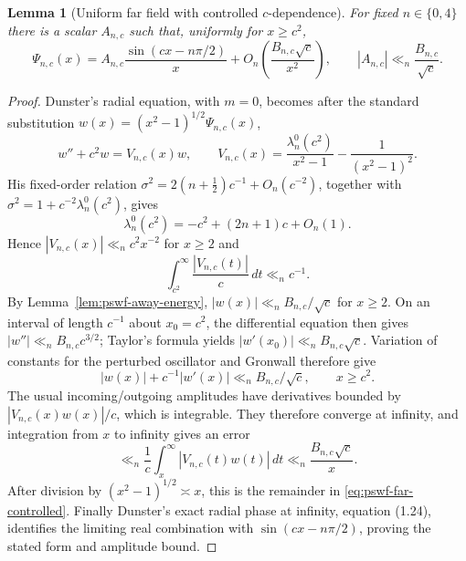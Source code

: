 \documentclass[11pt]{article}
\newtheorem{lemma}[theorem]{Lemma}
\theoremstyle{remark}
\begin{document}
\begin{lemma}[Uniform far field with controlled $c$-dependence]\label{lem:pswf-far-volterra}
For fixed $n\in\{0,4\}$ there is a scalar $A_{n,c}$ such that, uniformly for $x\ge c^2$,
\begin{equation}\label{eq:pswf-far-controlled}
 \Psi_{n,c}(x)
 =A_{n,c}\frac{\sin(cx-n\pi/2)}{x}
 +O_n\!\left(\frac{B_{n,c}\sqrt c}{x^2}\right),
 \qquad
 |A_{n,c}|\ll_n\frac{B_{n,c}}{\sqrt c}.
\end{equation}
\end{lemma}
\begin{proof}
Dunster's radial equation, with $m=0$, becomes after the standard substitution
$w(x)=(x^2-1)^{1/2}\Psi_{n,c}(x)$,
\[
 w''+c^2w=V_{n,c}(x)w,
 \qquad
 V_{n,c}(x)=\frac{\lambda_n^0(c^2)}{x^2-1}-\frac1{(x^2-1)^2}.
\]
His fixed-order relation $\sigma^2=2(n+\tfrac12)c^{-1}+O_n(c^{-2})$, together with
$\sigma^2=1+c^{-2}\lambda_n^0(c^2)$, gives
\[
 \lambda_n^0(c^2)=-c^2+(2n+1)c+O_n(1).
\]
Hence $|V_{n,c}(x)|\ll_n c^2x^{-2}$ for $x\ge2$ and
\[
 \int_{c^2}^\infty \frac{|V_{n,c}(t)|}{c}\,dt\ll_n c^{-1}.
\]
By Lemma~\ref{lem:pswf-away-energy}, $|w(x)|\ll_n B_{n,c}/\sqrt c$ for $x\ge2$.  On an interval of length $c^{-1}$ about $x_0=c^2$, the differential equation then gives
$|w''|\ll_n B_{n,c}c^{3/2}$; Taylor's formula yields
$|w'(x_0)|\ll_n B_{n,c}\sqrt c$.  Variation of constants for the perturbed oscillator and Gronwall therefore give
\[
 |w(x)|+c^{-1}|w'(x)|\ll_n B_{n,c}/\sqrt c,
 \qquad x\ge c^2.
\]
The usual incoming/outgoing amplitudes have derivatives bounded by
$|V_{n,c}(x)w(x)|/c$, which is integrable.  They therefore converge at infinity, and integration from $x$ to infinity gives an error
\[
 \ll_n \frac1c\int_x^\infty |V_{n,c}(t)w(t)|\,dt
 \ll_n \frac{B_{n,c}\sqrt c}{x}.
\]
After division by $(x^2-1)^{1/2}\asymp x$, this is the remainder in
\eqref{eq:pswf-far-controlled}.  Finally Dunster's exact radial phase at infinity, equation (1.24), identifies the limiting real combination with
$\sin(cx-n\pi/2)$, proving the stated form and amplitude bound.
\end{proof}
\end{document}
